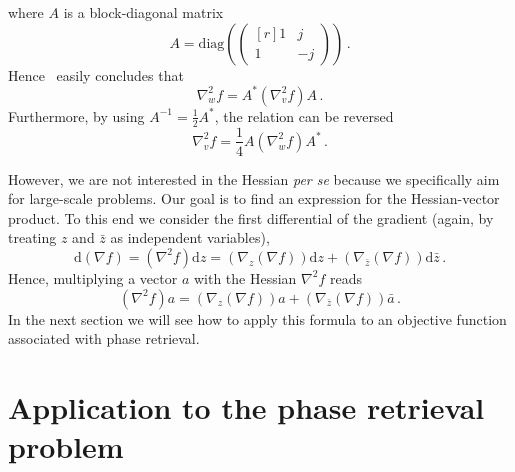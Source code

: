 where $A$ is a block-diagonal matrix
\begin{equation}
  \label{eq:76}
  A = \mathrm{diag}
  \left(
    \begin{pmatrix*}[r]
      1 & j \\
      1 & -j
    \end{pmatrix*}
  \right) \,. 
\end{equation}
Hence~\citeauthor{van_den_bos94complex} easily concludes that
\begin{equation}
  \label{eq:73}
  \nabla^{2}_{w}f =
  A^{*}
  \left(
    \nabla^{2}_{v}f
  \right) A \,. 
\end{equation}
Furthermore, by using $A^{-1} = \frac{1}{2}A^{*}$, the relation can be
reversed
\begin{equation}
  \label{eq:77}
  \nabla^{2}_{v}f =
  \frac{1}{4}
  A
  \left(
    \nabla^{2}_{w}f
  \right) A^{*} \,. 
\end{equation}

However, we are not interested in the Hessian \textit{per se} because
we specifically aim for large-scale problems. Our
goal is to find an expression for the Hessian-vector product.  To this
end we consider the first differential of the gradient (again, by
treating $z$ and $\bar{z}$ as independent variables),
\begin{equation}
  \label{eq:78}
  \mathrm{d} (\nabla f) =  \left(\nabla^{2}f\right) \mathrm{d} z =
    \left(
      \nabla_{z}(\nabla f)
    \right) \mathrm{d} z +
    \left(
      \nabla_{\bar z}(\nabla f)
    \right) \mathrm{d} \bar z \,. 
\end{equation}
Hence, multiplying a vector $a$ with the Hessian $\nabla^{2}f$ reads
\begin{equation}
  \label{eq:79}
  \left(
    \nabla^{2}f
  \right) a =
  \left(
    \nabla_{z}(\nabla f)
  \right)  a +
  \left(
    \nabla_{\bar z}(\nabla f)
  \right)  \bar a \,. 
\end{equation}
In the next section we will see how to apply this formula to an
objective function associated with phase retrieval.
\section{Application to the  phase retrieval problem}
\label{sec:appl-phase-retr}


